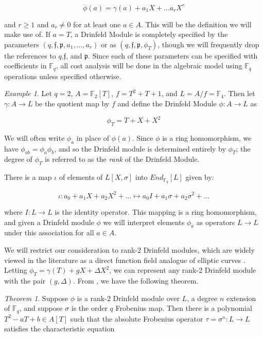 \documentclass{jams-l}
\theoremstyle{remark}
\numberwithin{equation}{section}
\newtheorem{theorem}{Theorem}
\newtheorem{example}{Example}
\newcommand{\frakf}{\mathfrak{f}}
\begin{document}
\[\phi(a) = \gamma(a) + a_1 X + \ldots a_rX^r\]

\noindent and $r \geq 1 $ and $a_r \neq 0$ for at least one $a \in A$. This will be the definition we will make use of. If $a = T$, a Drinfeld Module is completely specified by the parameters $(q,\frakf, \mathfrak{p}, a_1, \ldots, a_r)$ or as $(q,\frakf, \mathfrak{p}, \phi_T)$, though we will frequently drop the references to $q$,$\frakf$, and $\mathfrak{p}$. Since each of these parameters can be specified with coefficients in $\mathbb{F}_q$, all cost analysis will be done in the algebraic model using $\mathbb{F}_q$ operations unless specified otherwise.



\begin{example}
Let $q = 2$, $A = \mathbb{F}_2[T]$, $f = T^2 + T + 1$, and $L = A/f = \mathbb{F}_4$. Then let $\gamma: A \to L$ be the quotient map by $f$ and define the Drinfeld Module $\phi: A \to L$ as

\[ \phi_T = T + X + X^2\]

\end{example}

We will often write $\phi_a$ in place of $\phi(a)$. Since $\phi$ is a ring homomorphism, we have $\phi_{ab} = \phi_a \phi_b$, and so the Drinfeld module is determined entirely by $\phi_T$; the degree of $\phi_T$ is referred to as the \textit{rank} of the Drinfeld Module. 

There is a map $\iota$ of elements of $L[X, \sigma]$ into $End_{\mathbb{F}_q}[L]$ given by:

\[\iota: a_0 + a_1X + a_2X^2 + \ldots \mapsto a_0 I + a_1 \sigma + a_2 \sigma^2 + \ldots \]

\noindent where $I: L \to L$ is the identity operator. This mapping is a ring homomorphism, and given a Drinfeld module $\phi$ we will interpret elements $\phi_a$ as operators $L \to L$ under this association for all $a \in A$.

We will restrict our consideration to rank-2 Drinfeld modules, which are widely viewed in the literature as a direct function field analogue of elliptic curves \cite{GEKELE1991187}. Letting $\phi_T = \gamma(T) + g X + \Delta X^2$, we can represent any rank-2 Drinfeld module with the pair $(g,\Delta)$. From \cite{frobdist}, we have the following theorem. 
\begin{theorem}\label{charpoly}
Suppose $\phi$ is a rank-2 Drinfeld module over $L$, a degree $n$ extension of $\mathbb{F}_q$, and suppose $\sigma$ is the order $q$ Frobenius map. Then there is a polynomial $T^2 -aT + b \in A[T]$ such that the absolute Frobenius operator $\tau = \sigma^n: L \to L$  satisfies the characteristic equation
\end{theorem}
\end{document}
